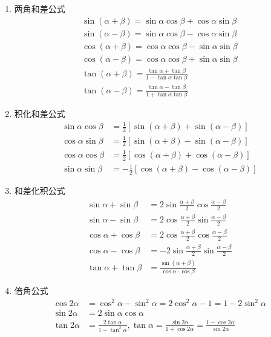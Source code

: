 \begin{enumerate}
\item 两角和差公式
\begin{gather*}
    \sin(\alpha+\beta)=\sin\alpha\cos\beta+\cos\alpha\sin\beta \\
    \sin(\alpha-\beta)=\sin\alpha\cos\beta-\cos\alpha\sin\beta \\
    \cos(\alpha+\beta)=\cos\alpha\cos\beta-\sin\alpha\sin\beta \\
    \cos(\alpha-\beta)=\cos\alpha\cos\beta+\sin\alpha\sin\beta\\
    \tan(\alpha+\beta)=\frac{\tan\alpha+\tan\beta}{1-\tan\alpha\tan\beta}\\
    \tan(\alpha-\beta)=\frac{\tan\alpha-\tan\beta}{1+\tan\alpha\tan\beta}
\end{gather*}
\item 积化和差公式
\begin{align*}
    \sin \alpha \cos \beta & =\frac{1}{2}[\sin (\alpha+\beta)+\sin(\alpha-\beta)]  \\
    \cos \alpha \sin \beta & =\frac{1}{2}[\sin (\alpha+\beta)-\sin(\alpha-\beta)]  \\
    \cos \alpha \cos \beta & =\frac{1}{2}[\cos (\alpha+\beta)+\cos(\alpha-\beta)]  \\
    \sin \alpha \sin \beta & =-\frac{1}{2}[\cos (\alpha+\beta)-\cos(\alpha-\beta)]
\end{align*}
\item 和差化积公式
\begin{align*}
    \sin\alpha+\sin\beta & =2\sin\frac{\alpha+\beta}{2}\cos\frac{\alpha-\beta}{2}  \\
    \sin\alpha-\sin\beta & =2\cos\frac{\alpha+\beta}{2}\sin\frac{\alpha-\beta}{2}  \\
    \cos\alpha+\cos\beta & =2\cos\frac{\alpha+\beta}{2}\cos\frac{\alpha-\beta}{2}  \\
    \cos\alpha-\cos\beta & =-2\sin\frac{\alpha+\beta}{2}\sin\frac{\alpha-\beta}{2} \\
    \tan\alpha+\tan\beta & =\frac{\sin (\alpha+\beta)}{\cos\alpha\cdot\cos \beta}
\end{align*}
\item 倍角公式
\begin{align*}
    \cos 2\alpha & =\cos^2 \alpha-\sin^2\alpha=2\cos^2\alpha-1=1-2\sin^2\alpha\\
    \sin 2\alpha  & =2\sin \alpha \cos \alpha\\
    \tan 2\alpha  & =\frac{2\tan\alpha}{1-\tan^2\alpha}, \tan\alpha=\frac{\sin2\alpha}{1+\cos2\alpha}=\frac{1-\cos2\alpha}{\sin2\alpha}
\end{align*}
\end{enumerate}

